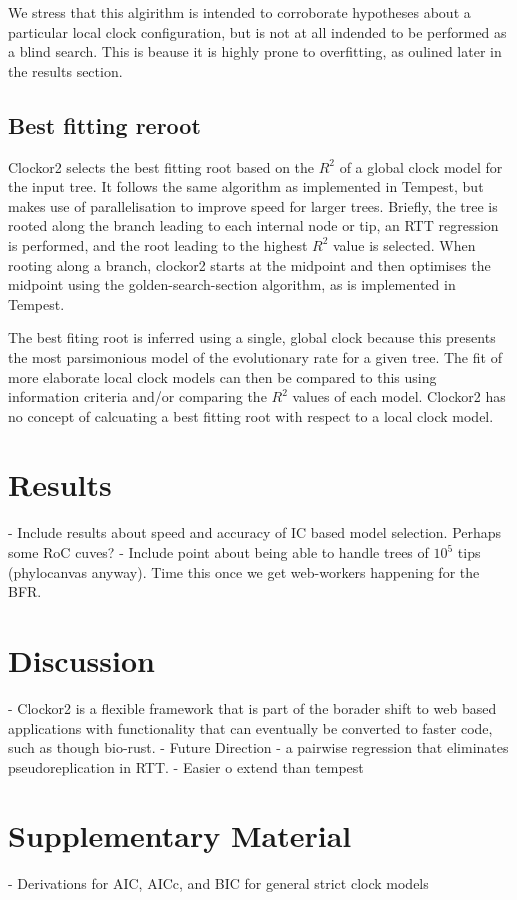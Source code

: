 \documentclass{article}
\begin{document}
We stress that this algirithm is intended to corroborate hypotheses about a particular local clock configuration, but is not at all indended to be performed as a blind search. This is beause it is highly prone to overfitting, as oulined later in the results section.


\subsection*{Best fitting reroot}
Clockor2 selects the best fitting root based on the $R^2$ of a global clock model for the input tree. It follows the same algorithm as implemented in Tempest, but makes use of parallelisation to improve speed for larger trees. Briefly, the tree is rooted along the branch leading to each internal node or tip, an RTT regression is performed, and the root leading to the highest $R^2$ value is selected. When rooting along a branch, clockor2 starts at the midpoint and then optimises the midpoint using the golden-search-section algorithm, as is implemented in Tempest.

The best fiting root is inferred using a single, global clock because this presents the most parsimonious model of the evolutionary rate for a given tree. The fit of more elaborate local clock models can then be compared to this using information criteria and/or comparing the $R^2$ values of each model. Clockor2 has no concept of calcuating a best fitting root with respect to a local clock model.

\section*{Results}
- Include results about speed and accuracy of IC based model selection. Perhaps some RoC cuves?
- Include point about being able to handle trees of $10^5$ tips (phylocanvas anyway). Time this once we get web-workers happening for the BFR.

\section*{Discussion}
- Clockor2 is a flexible framework that is part of the borader shift to web based applications with functionality that can eventually be converted to faster code, such as though bio-rust.
- Future Direction - a pairwise regression that eliminates pseudoreplication in RTT.
- Easier o extend than tempest



\section*{Supplementary Material}
- Derivations for AIC, AICc, and BIC for general strict clock models
\end{document}
